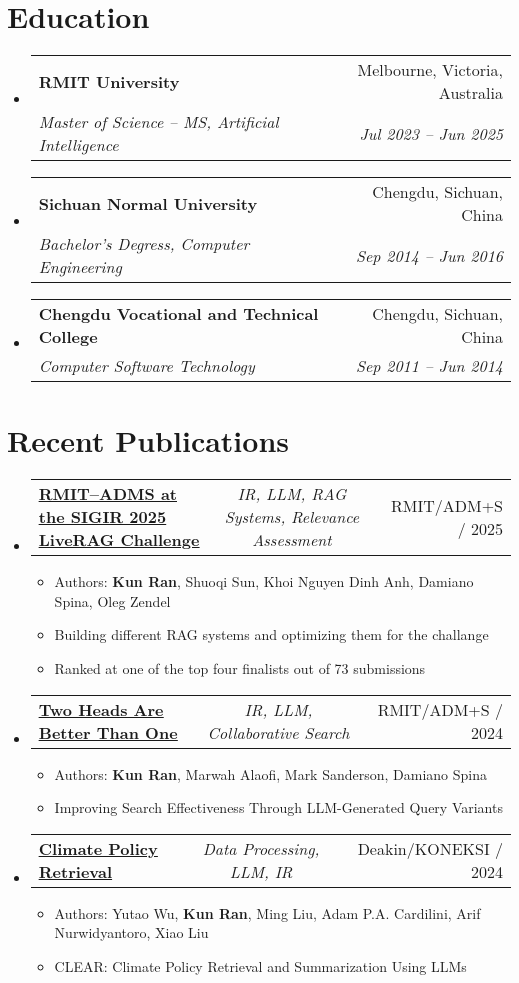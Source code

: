 \documentclass[a4paper,11pt]{article}
\makeatletter
\newcommand{\resumeItem}[1]{
  \item\small{#1}
}
\newcommand{\resumeItemListStart}{\begin{itemize}[rightmargin=0.11in]}
\newcommand{\resumeItemListEnd}{\end{itemize}}
\newcommand{\resumeTrioHeading}[3]{
  \item\small{
    \begin{tabular*}{0.96\textwidth}[t]{
      l@{\extracolsep{\fill}}c@{\extracolsep{\fill}}r
    }
      \textbf{#1} & \textit{#2} & #3
    \end{tabular*}
  }
}
\newcommand{\resumeQuadHeading}[4]{
  \item
  \begin{tabular*}{0.96\textwidth}[t]{l@{\extracolsep{\fill}}r}
    \textbf{#1} & #2 \\
    \textit{\small#3} & \textit{\small #4} \\
  \end{tabular*}
}
\newcommand{\resumeHeadingListStart}{
  \begin{itemize}[leftmargin=0.15in, label={}]
}
\newcommand{\resumeHeadingListEnd}{\end{itemize}}
\makeatother
\begin{document}
\section{Education}
  \resumeHeadingListStart{}
    \resumeQuadHeading{RMIT University}{Melbourne, Victoria, Australia}
    {Master of Science -- MS, Artificial Intelligence}{Jul 2023 -- Jun 2025}
    \resumeQuadHeading{Sichuan Normal University}{Chengdu, Sichuan, China}
    {Bachelor's Degress, Computer Engineering}{Sep 2014 -- Jun 2016}
    \resumeQuadHeading{Chengdu Vocational and Technical College}{Chengdu, Sichuan, China}
    {Computer Software Technology}{Sep 2011 -- Jun 2014}
  \resumeHeadingListEnd{}

\section{Recent Publications}
  \resumeHeadingListStart{}
    \resumeTrioHeading{\href{https://liverag.tii.ae/}{\uline{RMIT–ADMS at the SIGIR 2025 LiveRAG Challenge}}}{IR, LLM, RAG Systems, Relevance Assessment}{RMIT/ADM+S / 2025}
    \resumeItemListStart{}
      \resumeItem{Authors: \textbf{Kun Ran}, Shuoqi Sun, Khoi Nguyen Dinh Anh, Damiano Spina, Oleg Zendel}
      \resumeItem{Building different RAG systems and optimizing them for the challange}
      \resumeItem{Ranked at one of the top four finalists out of 73 submissions}
    \resumeItemListEnd{}

    \resumeTrioHeading{\href{https://dl.acm.org/doi/10.1145/3698204.3716468}{\uline{Two Heads Are Better Than One}}}{IR, LLM, Collaborative Search}{RMIT/ADM+S / 2024}
    \resumeItemListStart{}
      \resumeItem{Authors: \textbf{Kun Ran}, Marwah Alaofi, Mark Sanderson, Damiano Spina}
      \resumeItem{Improving Search Effectiveness Through LLM-Generated Query Variants}
    \resumeItemListEnd{}

    \resumeTrioHeading{\href{https://counterinfodemic.org/}{\uline{Climate Policy Retrieval}}}{Data Processing, LLM, IR}{Deakin/KONEKSI / 2024}
    \resumeItemListStart{}
      \resumeItem{Authors: Yutao Wu, \textbf{Kun Ran}, Ming Liu, Adam P.A. Cardilini, Arif Nurwidyantoro, Xiao Liu}
      \resumeItem{CLEAR: Climate Policy Retrieval and Summarization Using LLMs}
    \resumeItemListEnd{}
  \resumeHeadingListEnd{}

\end{document}
